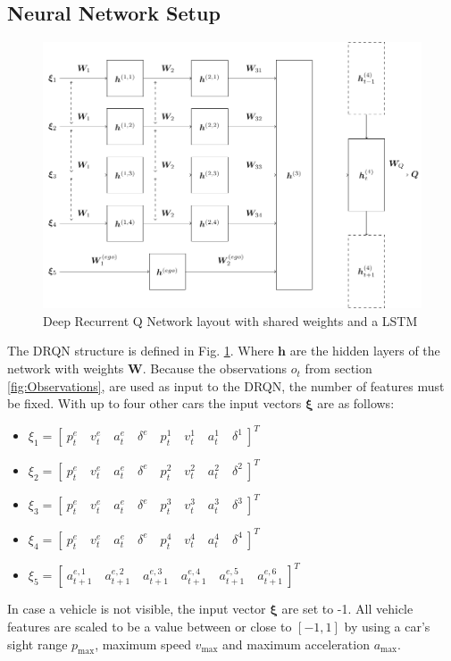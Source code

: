 \subsection{Neural Network Setup}
\begin{figure}[!t]
	\centering
	\includegraphics[width=0.95\columnwidth]{figures/figures-network.pdf}
	\caption{Deep Recurrent Q Network layout with shared weights and a LSTM}
	\label{fig:network}
\end{figure}

The DRQN structure is defined in Fig. \ref{fig:network}. Where $\bm{h}$ are the hidden layers of the network with weights $\bm{W}$. Because the observations $o_t$ from section \ref{fig:Observations}, are used as input to the DRQN, the number of features must be fixed. With up to four other cars the input vectors $\bm{\xi}$ are as follows:
\vspace{0.3cm}
\begin{itemize}
	\item $ \xi_1 = [\  p^e_t \quad v^e_t \quad a^e_t \quad \delta^e \quad p^1_t \quad v^1_t \quad a^1_t \quad \delta^1 \  ]^T$
	\item $ \xi_2 = [\  p^e_t \quad v^e_t \quad a^e_t \quad \delta^e \quad p^2_t \quad v^2_t \quad a^2_t \quad \delta^2 \  ]^T$
	\item $ \xi_3 = [\  p^e_t \quad v^e_t \quad a^e_t \quad \delta^e \quad p^3_t \quad v^3_t \quad a^3_t \quad \delta^3 \  ]^T$
	\item $ \xi_4 = [\  p^e_t \quad v^e_t \quad a^e_t \quad \delta^e \quad p^4_t \quad v^4_t \quad a^4_t \quad \delta^4 \  ]^T$
	\item $ \xi_5 = [\  a^{e, 1}_{t+1} \quad a^{e, 2}_{t+1} \quad a^{e, 3}_{t+1} \quad a^{e, 4}_{t+1} \quad a^{e, 5}_{t+1} \quad a^{e, 6}_{t+1} \  ]^T$
\end{itemize}
\vspace{0.3cm}
In case a vehicle is not visible, the input vector $\bm{\xi}$ are set to -1. All vehicle features are scaled to be a value between or close to $[-1,1]$ by using a car's sight range $p_{\max}$, maximum speed $v_{\max}$ and maximum acceleration $a_{\max}$.

